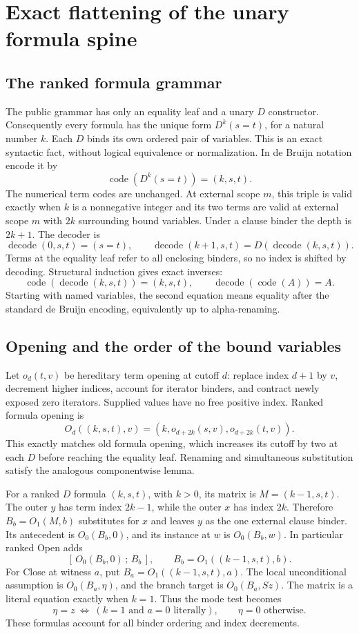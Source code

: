 
\section{Exact flattening of the unary formula spine}
\subsection{The ranked formula grammar}
The public grammar has only an equality leaf and a unary \(D\) constructor.
Consequently every formula has the unique form \(D^k(s=t)\), for a natural
number \(k\). Each \(D\) binds its own ordered pair of variables. This is
an exact syntactic fact, without logical equivalence or normalization.
In de Bruijn notation encode it by
\[
 \operatorname{code}(D^k(s=t))=(k,s,t).
\]
The numerical term codes are unchanged. At external scope \(m\), this
triple is valid exactly when \(k\) is a nonnegative integer and its two
terms are valid at external scope \(m\) with \(2k\) surrounding bound
variables. Under a clause binder the depth is \(2k+1\).
The decoder is
\[
 \operatorname{decode}(0,s,t)=(s=t),\qquad
 \operatorname{decode}(k+1,s,t)=D(\operatorname{decode}(k,s,t)).
\]
Terms at the equality leaf refer to all enclosing binders, so no index
is shifted by decoding. Structural induction gives exact inverses:
\[
 \operatorname{code}(\operatorname{decode}(k,s,t))=(k,s,t),\qquad
 \operatorname{decode}(\operatorname{code}(A))=A.
\]
Starting with named variables, the second equation means equality after
the standard de Bruijn encoding, equivalently up to alpha-renaming.

\subsection{Opening and the order of the bound variables}
Let \(o_d(t,v)\) be hereditary term opening at cutoff \(d\): replace
index \(d+1\) by \(v\), decrement higher indices, account for iterator
binders, and contract newly exposed zero iterators. Supplied values have
no free positive index. Ranked formula opening is
\[
 O_d((k,s,t),v)
   =(k,o_{d+2k}(s,v),o_{d+2k}(t,v)).
\]
This exactly matches old formula opening, which increases its cutoff
by two at each \(D\) before reaching the equality leaf. Renaming and
simultaneous substitution satisfy the analogous componentwise lemma.

For a ranked \(D\) formula \((k,s,t)\), with \(k>0\), its matrix is
\(M=(k-1,s,t)\). The outer \(y\) has term index \(2k-1\), while the
outer \(x\) has index \(2k\). Therefore \(B_b=O_1(M,b)\) substitutes
for \(x\) and leaves \(y\) as the one external clause binder.
Its antecedent is \(O_0(B_b,0)\), and its instance at \(w\) is
\(O_0(B_b,w)\). In particular ranked Open adds
\[
 [\,O_0(B_b,0)\,;\,B_b\,],\qquad B_b=O_1((k-1,s,t),b).
\]
For Close at witness \(a\), put \(B_a=O_1((k-1,s,t),a)\).
The local unconditional assumption is \(O_0(B_a,\eta)\), and the
branch target is \(O_0(B_a,Sz)\). The matrix is a literal equation
exactly when \(k=1\). Thus the mode test becomes
\[
 \eta=z\ \Longleftrightarrow\ (k=1\text{ and }a=0\text{ literally}),
 \qquad \eta=0\text{ otherwise}.
\]
These formulas account for all binder ordering and index decrements.

